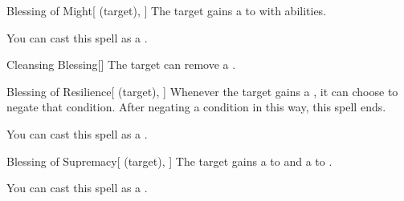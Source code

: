 \lowercase{\hypertarget{spell:Blessing of Might}{}}\label{spell:Blessing of Might}
\begin{attuneability}[Rank 3]{\hypertarget{spell:Blessing of Might}{Blessing of Might}}[ (target), ]
The target gains a   to  with  abilities.

You can cast this spell as a .
\end{attuneability}
\vspace{0.25em}



\lowercase{\hypertarget{spell:Cleansing Blessing}{}}\label{spell:Cleansing Blessing}
\begin{freeability}[Rank 3]{\hypertarget{spell:Cleansing Blessing}{Cleansing Blessing}}[]
The target can remove a .
\end{freeability}
\vspace{0.25em}



\lowercase{\hypertarget{spell:Blessing of Resilience}{}}\label{spell:Blessing of Resilience}
\begin{attuneability}[Rank 4]{\hypertarget{spell:Blessing of Resilience}{Blessing of Resilience}}[ (target), ]
Whenever the target gains a , it can choose to negate that condition.
After negating a condition in this way, this spell ends.

You can cast this spell as a .
\end{attuneability}
\vspace{0.25em}



\lowercase{\hypertarget{spell:Blessing of Supremacy}{}}\label{spell:Blessing of Supremacy}
\begin{attuneability}[Rank 4]{\hypertarget{spell:Blessing of Supremacy}{Blessing of Supremacy}}[ (target), ]
The target gains a   to  and a   to .

You can cast this spell as a .
\end{attuneability}
\vspace{0.25em}



